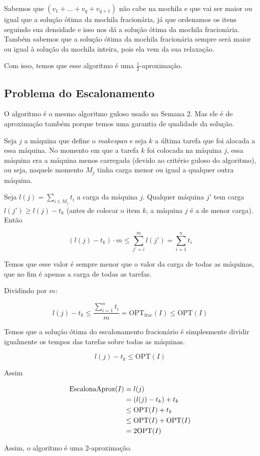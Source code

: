 Sabemos que $(v_1+\dots+v_q+v_{q+1})$ não cabe na mochila e que vai ser maior ou igual que a solução ótima da mochila fracionária, já que ordenamos os itens seguindo sua densidade e isso nos dá a solução ótima da mochila fracionária. Também sabemos que a solução ótima da mochila fracionária sempre será maior ou igual à solução da mochila inteira, pois ela vem da sua relaxação.

Com isso, temos que esse algoritmo é uma $\frac{1}{2}$-aproximação.

\subsection{Problema do Escalonamento}

\begin{algorithm}
	\SetAlgoLined
\end{algorithm}

O algoritmo é o mesmo algoritmo guloso usado na Semana 2. Mas ele é de aproximação também porque temos uma garantia de qualidade da solução.

Seja $j$ a máquina que define o \textit{makespan} e seja $k$ a última tarefa que foi alocada a essa máquina. No momento em que a tarefa $k$ foi colocada na máquina $j$, essa máquina era a máquina menos carregada (devido ao critério guloso do algoritmo), ou seja, naquele momento $M_j$ tinha carga menor ou igual a qualquer outra máquina.

Seja $l(j)=\sum_{i \in M_j}t_i$ a carga da máquina $j$. Qualquer máquina $j'$ tem carga $l(j')\geq l(j)-t_k$ (antes de colocar o item $k$, a máquina $j$ é a de menor carga). Então

\[
	(l(j)-t_k) \cdot m \leq \sum_{j'=i}^ml(j') = \sum_{i=1}^nt_i
\]

Temos que esse valor é sempre menor que o valor da carga de todas as máquinas, que no fim é apenas a carga de todas as tarefas.

Dividindo por $m$:

\[
	l(j)-t_k \leq \frac{\sum_{i=1}^nt_i}{m} = \mathrm{OPT}_{\mathrm{frac}}(I) \leq \mathrm{OPT}(I)
\]

Temos que a solução ótima do escalonamento fracionário é simplesmente dividir igualmente os tempos das tarefas sobre todas as máquinas.

\[
	l(j)-t_k \leq \mathrm{OPT}(I)
\]

Assim

\begin{align*}
	\text{\lstinline{EscalonaAprox}}(I) &= l(j)\\
	&= (l(j)-t_k)+t_k \\
	&\leq \mathrm{OPT}(I) + t_k \\
	&\leq \mathrm{OPT}(I) + \mathrm{OPT}(I)\\
	&=2 \mathrm{OPT}(I)
\end{align*}

Assim, o algoritmo é uma 2-aproximação.